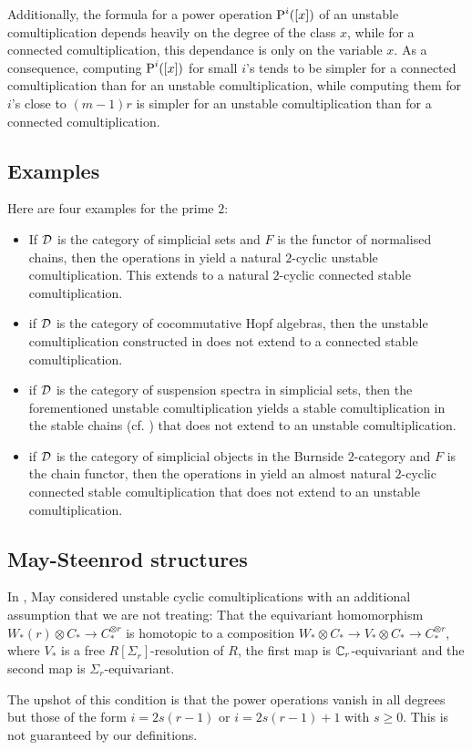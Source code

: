 Additionally, the formula for a power operation $\operatorname{P}^i([x])$ of an unstable comultiplication depends heavily on the degree of the class $x$, while for a connected comultiplication, this dependance is only on the variable $x$. As a consequence, computing $\operatorname{P}^i([x])$ for small $i$'s tends to be simpler for a connected comultiplication than for an unstable comultiplication, while computing them for $i$'s close to $(m-1)r$ is simpler for an unstable comultiplication than for a connected comultiplication.

\subsection{Examples}

Here are four examples for the prime $2$:
\begin{itemize}
	\item If $\mathcal{D}$ is the category of simplicial sets and $F$ is the functor of normalised chains, then the operations in \cite{steenrod1947products} yield a natural $2$-cyclic unstable comultiplication. This extends to a natural $2$-cyclic connected stable comultiplication.
	\item if $\mathcal{D}$ is the category of cocommutative Hopf algebras, then the unstable comultiplication constructed in \cite{may1970general} does not extend to a connected stable comultiplication.
	\item if $\mathcal{D}$ is the category of suspension spectra in simplicial sets, then the forementioned unstable comultiplication yields a stable comultiplication in the stable chains (cf. \cite{Gill2020}) that does not extend to an unstable comultiplication.
	\item if $\mathcal{D}$ is the category of simplicial objects in the Burnside $2$-category and $F$ is the chain functor, then the operations in \cite{cantero-moran2020khovanov} yield an almost natural $2$-cyclic connected stable comultiplication that does not extend to an unstable comultiplication.

\end{itemize}

\subsection{May-Steenrod structures}

In \cite{may1970general}, May considered unstable cyclic comultiplications with an additional assumption that we are not treating: That %
the equivariant homomorphism $W_*(r)\otimes C_*\to C_*^{\otimes r}$ is homotopic to a composition $W_*\otimes C_*\to V_*\otimes C_*\to C_*^{\otimes r}$, where $V_*$ is a free $R[\Sigma_r]$-resolution of $R$, the first map is $\mathbb{C}_r$-equivariant and the second map is $\Sigma_r$-equivariant.

The upshot of this condition is that the power operations vanish in all degrees but those of the form $i = 2s(r-1)$ or $i = 2s(r-1)+1$ with $s\geq 0$. This is not guaranteed by our definitions.
